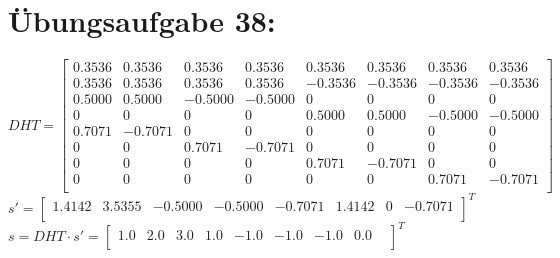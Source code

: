 

	\section*{Übungsaufgabe 38:}

	$
    DHT =
    \begin{bmatrix}
	0.3536 &    0.3536 &    0.3536 &   0.3536 &    0.3536 &   0.3536 &    0.3536 &    0.3536 \\
    0.3536 &    0.3536 &     0.3536 &   0.3536 &   -0.3536 &  -0.3536 &   -0.3536 &    -0.3536 \\
    0.5000 &    0.5000 &  -0.5000 &  -0.5000 &        0 &        0 &        0 &        0 \\
         0 &        0 &        0 &        0 &   0.5000 &   0.5000 &  -0.5000 &  -0.5000 \\
    0.7071 &  -0.7071 &        0 &        0 &        0 &        0 &        0 &        0 \\
         0 &        0 &   0.7071 &   -0.7071 &        0 &        0 &        0 &        0 \\
         0 &        0 &        0  &       0 &   0.7071 &  -0.7071 &        0 &        0 \\
         0 &        0 &        0   &      0 &        0 &        0 &   0.7071 &  -0.7071 \\

    \end{bmatrix}
    $ \\ $
    s' =
    \begin{bmatrix}
		1.4142 &   3.5355 &  -0.5000 &  -0.5000 &  -0.7071 &   1.4142 &        0 &  -0.7071 \\
    \end{bmatrix}
    ^T $ \\ $
    s = DHT \cdot s' =
    \begin{bmatrix}
    1.0 & 2.0 & 3.0 & 1.0 & -1.0 & -1.0 & -1.0 & 0.0 & \\
    \end{bmatrix}
    ^T $ \newline
	
